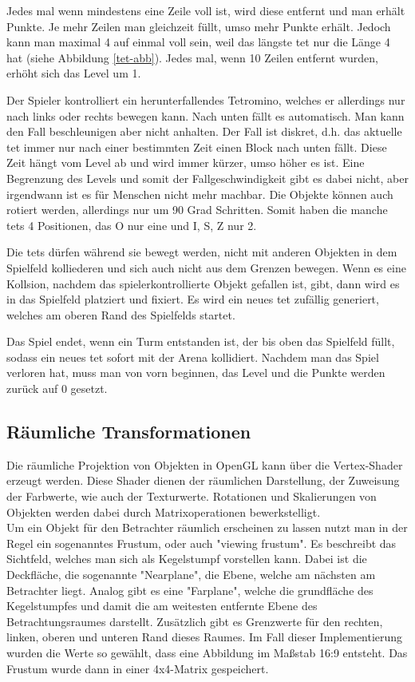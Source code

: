 \documentclass[11pt]{article}
\newcommand{\refabb}[1]{Abbildung \ref{#1}}
\begin{document}
Jedes mal wenn mindestens eine Zeile voll ist, wird diese entfernt und man erhält Punkte.
Je mehr Zeilen man gleichzeit füllt, umso mehr Punkte erhält. Jedoch kann man maximal 4 auf einmal voll sein, weil das längste \gls{tet} 
nur die Länge 4 hat (siehe \refabb{tet-abb}). Jedes mal, wenn 10 Zeilen entfernt wurden, erhöht sich das Level um 1.\cite{TetrisWiki}

Der Spieler kontrolliert ein herunterfallendes Tetromino, welches er allerdings nur nach links oder rechts bewegen kann.
Nach unten fällt es automatisch. Man kann den Fall beschleunigen aber nicht anhalten. 
Der Fall ist diskret, d.h. das aktuelle \gls{tet} immer nur nach einer bestimmten Zeit einen Block nach unten fällt.
Diese Zeit hängt vom Level ab und wird immer kürzer, umso höher es ist. Eine Begrenzung des Levels und somit der Fallgeschwindigkeit gibt es dabei nicht,
aber irgendwann ist es für Menschen nicht mehr machbar.
Die Objekte können auch rotiert werden, allerdings nur um 90 Grad Schritten. Somit haben die manche \glspl{tet} 4 Positionen, das O nur eine und I, S, Z nur 2.

Die \glspl{tet} dürfen während sie bewegt werden, nicht mit anderen Objekten in dem Spielfeld kolliederen und sich auch nicht aus dem Grenzen bewegen.
Wenn es eine Kollsion, nachdem das spielerkontrollierte Objekt gefallen ist, gibt, dann wird es in das Spielfeld platziert und fixiert. Es wird ein neues \gls{tet} 
zufällig generiert, welches am oberen Rand des Spielfelds startet.

Das Spiel endet, wenn ein Turm entstanden ist, der bis oben das Spielfeld füllt, sodass ein neues \gls{tet} sofort mit der Arena kollidiert.
Nachdem man das Spiel verloren hat, muss man von vorn beginnen, das Level und die Punkte werden zurück auf 0 gesetzt.

\subsection{Räumliche Transformationen}

Die räumliche Projektion von Objekten in OpenGL kann über die Vertex-Shader erzeugt werden. Diese Shader dienen der räumlichen Darstellung, der Zuweisung der Farbwerte,
wie auch der Texturwerte. Rotationen und Skalierungen von Objekten werden dabei durch Matrixoperationen bewerkstelligt.\\
Um ein Objekt für den Betrachter räumlich erscheinen zu lassen nutzt man in der Regel ein sogenanntes Frustum, oder auch "viewing frustum". Es beschreibt das Sichtfeld, 
welches man sich als Kegelstumpf vorstellen kann. Dabei ist die Deckfläche, die sogenannte "Nearplane", die Ebene, welche am nächsten am Betrachter liegt. Analog gibt es 
eine "Farplane", welche die grundfläche des Kegelstumpfes und damit die am weitesten entfernte Ebene des Betrachtungsraumes darstellt.
Zusätzlich gibt es Grenzwerte für den rechten, linken, oberen und unteren Rand dieses Raumes.
Im Fall dieser Implementierung wurden die Werte so gewählt, dass eine Abbildung im Maßstab 16:9 entsteht. Das Frustum wurde dann in einer 4x4-Matrix gespeichert.
\end{document}
